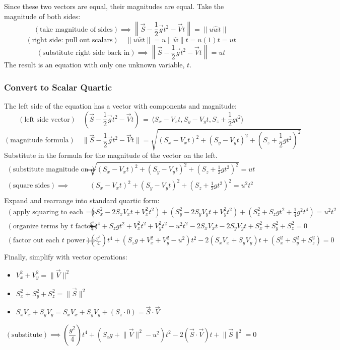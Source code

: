 \documentclass{article}
\begin{document}
Since these two vectors are equal, their magnitudes are equal. Take the magnitude of both sides:
\[ (\text{take magnitude of sides})\implies\left\lVert\vec{S}-\frac{1}{2}\vec{g}t^2-\vec{V}t\right\rVert=\lVert u\hat{w}t \rVert \]
\[ (\text{right side: pull out scalars})\quad\lVert u\hat{w}t \rVert=u\lVert\hat{w}\rVert t=u(1)t=ut \]
\[ (\text{substitute right side back in})\implies\left\lVert\vec{S}-\frac{1}{2}\vec{g}t^2-\vec{V}t\right\rVert=ut \]
The result is an equation with only one unknown variable, $t$.

\subsubsection*{Convert to Scalar Quartic}
The left side of the equation has a vector with components and magnitude:
\[ (\text{left side vector})\quad(\vec{S}-\frac{1}{2}\vec{g}t^2-\vec{V}t)\,=\,\langle S_x-V_xt,S_y-V_yt,S_z+\frac{1}{2}gt^2 \rangle \]
\[ (\text{magnitude formula})\quad\lVert\vec{S}-\frac{1}{2}\vec{g}t^2-\vec{V}t\rVert=\sqrt{(S_x-V_xt)^2+(S_y-V_yt)^2+(S_z+\frac{1}{2}gt^2)^2} \]
Substitute in the formula for the magnitude of the vector on the left.
\begin{align*}
    (\text{substitute magnitude on left})\implies&\sqrt{(S_x-V_xt)^2+(S_y-V_yt)^2+(S_z+\frac{1}{2}gt^2)^2}=ut \\
    (\text{square sides})\implies&(S_x-V_xt)^2+(S_y-V_yt)^2+(S_z+\frac{1}{2}gt^2)^2=u^2t^2 \\
\end{align*}
Expand and rearrange into standard quartic form:
\begin{align*}
    (\text{apply squaring to each group})\implies&(S_x^2-2S_xV_xt+V_x^2t^2)+(S_y^2-2S_yV_yt+V_y^2t^2)+(S_z^2+S_zgt^2+\frac{1}{4}g^2t^4)=u^2t^2 \\
    (\text{organize terms by }t\text{ factor})\implies&\frac{g^2}{4}t^4+S_zgt^2+V_x^2t^2+V_y^2t^2-u^2t^2-2S_xV_xt-2S_yV_yt+S_x^2+S_y^2+S_z^2=0 \\
    (\text{factor out each }t\text{ power})\implies&(\frac{g^2}{4})t^4+(S_zg+V_x^2+V_y^2-u^2)t^2-2(S_xV_x+S_yV_y)t+(S_x^2+S_y^2+S_z^2)=0 \\
\end{align*}
Finally, simplify with vector operations:
\begin{itemize}
    \item $V_x^2+V_y^2=\lVert\vec{V}\rVert^2$
    \item $S_x^2+S_y^2+S_z^2=\lVert\vec{S}\rVert^2$
    \item $S_xV_x+S_yV_y=S_xV_x+S_yV_y+(S_z\cdot0)=\vec{S}\cdot\vec{V}$
\end{itemize}
\[ (\text{substitute})\implies\boxed{(\frac{g^2}{4})t^4+(S_zg+\lVert\vec{V}\rVert^2-u^2)t^2-2(\vec{S}\cdot\vec{V})t+\lVert\vec{S}\rVert^2=0} \]
\end{document}

